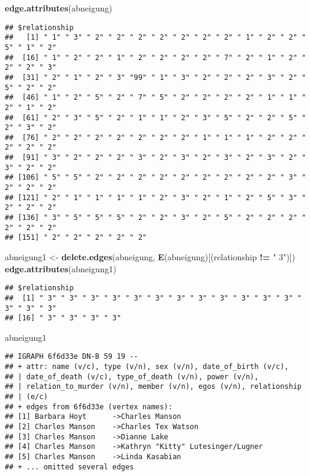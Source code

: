 \documentclass[
]{article}
\newenvironment{Shaded}{\begin{snugshade}}{\end{snugshade}}
\newcommand{\KeywordTok}[1]{\textcolor[rgb]{0.13,0.29,0.53}{\textbf{#1}}}
\newcommand{\NormalTok}[1]{#1}
\newcommand{\OperatorTok}[1]{\textcolor[rgb]{0.81,0.36,0.00}{\textbf{#1}}}
\newcommand{\StringTok}[1]{\textcolor[rgb]{0.31,0.60,0.02}{#1}}
\begin{document}
\begin{Shaded}
\begin{Highlighting}[]
\KeywordTok{edge.attributes}\NormalTok{(abneigung)}
\end{Highlighting}
\end{Shaded}

\begin{verbatim}
## $relationship
##   [1] " 1" " 3" " 2" " 2" " 2" " 2" " 2" " 2" " 2" " 1" " 2" " 2" " 5" " 1" " 2"
##  [16] " 1" " 2" " 2" " 1" " 2" " 2" " 2" " 2" " 7" " 2" " 1" " 2" " 2" " 2" " 3"
##  [31] " 2" " 1" " 2" " 3" "99" " 1" " 3" " 2" " 2" " 2" " 3" " 2" " 5" " 2" " 2"
##  [46] " 1" " 2" " 5" " 2" " 7" " 5" " 2" " 2" " 2" " 2" " 1" " 1" " 2" " 1" " 2"
##  [61] " 2" " 3" " 5" " 2" " 1" " 1" " 2" " 3" " 5" " 2" " 2" " 5" " 2" " 3" " 2"
##  [76] " 2" " 2" " 2" " 2" " 2" " 2" " 2" " 1" " 1" " 1" " 2" " 2" " 2" " 2" " 2"
##  [91] " 3" " 2" " 2" " 2" " 3" " 2" " 3" " 2" " 3" " 2" " 3" " 2" " 3" " 2" " 2"
## [106] " 5" " 5" " 2" " 2" " 2" " 2" " 2" " 2" " 2" " 2" " 2" " 3" " 2" " 2" " 2"
## [121] " 2" " 1" " 1" " 1" " 1" " 2" " 3" " 2" " 1" " 2" " 5" " 3" " 2" " 2" " 2"
## [136] " 3" " 5" " 5" " 5" " 2" " 2" " 3" " 2" " 5" " 2" " 2" " 2" " 2" " 2" " 2"
## [151] " 2" " 2" " 2" " 2" " 2"
\end{verbatim}

\begin{Shaded}
\begin{Highlighting}[]
\NormalTok{abneigung1 <-}
\StringTok{  }\KeywordTok{delete.edges}\NormalTok{(abneigung, }\KeywordTok{E}\NormalTok{(abneigung)[(relationship }\OperatorTok{!=}\StringTok{ " 3"}\NormalTok{)])}
\KeywordTok{edge.attributes}\NormalTok{(abneigung1)}
\end{Highlighting}
\end{Shaded}

\begin{verbatim}
## $relationship
##  [1] " 3" " 3" " 3" " 3" " 3" " 3" " 3" " 3" " 3" " 3" " 3" " 3" " 3" " 3" " 3"
## [16] " 3" " 3" " 3" " 3"
\end{verbatim}

\begin{Shaded}
\begin{Highlighting}[]
\NormalTok{abneigung1}
\end{Highlighting}
\end{Shaded}

\begin{verbatim}
## IGRAPH 6f6d33e DN-B 59 19 -- 
## + attr: name (v/c), type (v/n), sex (v/n), date_of_birth (v/c),
## | date_of_death (v/c), type_of_death (v/n), power (v/n),
## | relation_to_murder (v/n), member (v/n), egos (v/n), relationship
## | (e/c)
## + edges from 6f6d33e (vertex names):
## [1] Barbara Hoyt      ->Charles Manson                   
## [2] Charles Manson    ->Charles Tex Watson               
## [3] Charles Manson    ->Dianne Lake                      
## [4] Charles Manson    ->Kathryn "Kitty" Lutesinger/Lugner
## [5] Charles Manson    ->Linda Kasabian                   
## + ... omitted several edges
\end{verbatim}
\end{document}

